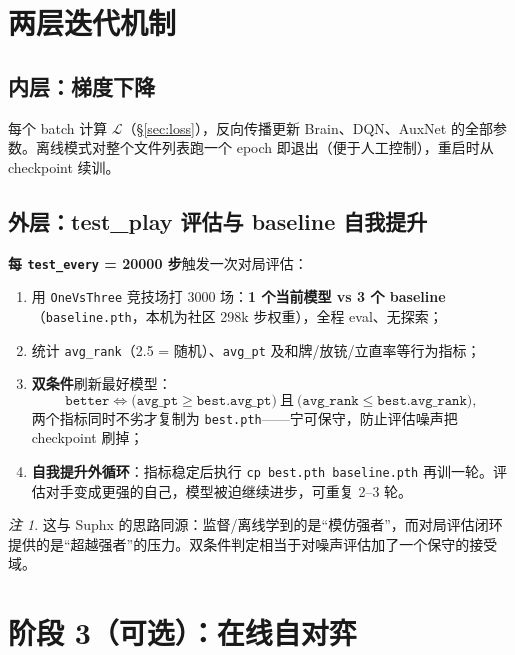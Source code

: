 \documentclass[11pt,a4paper]{ctexart}
\theoremstyle{remark}
\newtheorem*{rem}{注}
\begin{document}
\section{两层迭代机制}\label{sec:iter}

\subsection{内层：梯度下降}

每个 batch 计算 $\mathcal{L}$（\S\ref{sec:loss}），反向传播更新 Brain、DQN、AuxNet 的全部参数。离线模式对整个文件列表跑一个 epoch 即退出（便于人工控制），重启时从 checkpoint 续训。

\subsection{外层：test\_play 评估与 baseline 自我提升}

\textbf{每 \texttt{test\_every} = 20000 步}触发一次对局评估：

\begin{enumerate}[leftmargin=2em, label=(\arabic*)]
  \item 用 \texttt{OneVsThree} 竞技场打 3000 场：\textbf{1 个当前模型 vs 3 个 baseline}（\texttt{baseline.pth}，本机为社区 298k 步权重），全程 eval、无探索；
  \item 统计 \texttt{avg\_rank}（2.5 = 随机）、\texttt{avg\_pt} 及和牌/放铳/立直率等行为指标；
  \item \textbf{双条件}刷新最好模型：
  \[
  \texttt{better} \iff \big(\texttt{avg\_pt} \ge \texttt{best.avg\_pt}\big)\ \textbf{且}\ \big(\texttt{avg\_rank} \le \texttt{best.avg\_rank}\big),
  \]
  两个指标同时不劣才复制为 \texttt{best.pth}——宁可保守，防止评估噪声把 checkpoint 刷掉；
  \item \textbf{自我提升外循环}：指标稳定后执行 \texttt{cp best.pth baseline.pth} 再训一轮。评估对手变成更强的自己，模型被迫继续进步，可重复 2--3 轮。
\end{enumerate}

\begin{rem}
这与 Suphx 的思路同源：监督/离线学到的是``模仿强者''，而对局评估闭环提供的是``超越强者''的压力。双条件判定相当于对噪声评估加了一个保守的接受域。
\end{rem}

\section{阶段 3（可选）：在线自对弈}\label{sec:online}
\end{document}
